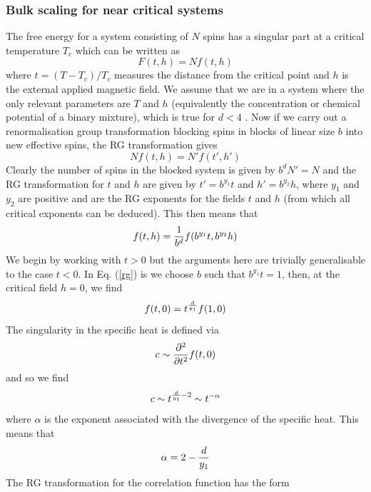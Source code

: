 \subsubsection{Bulk scaling for near critical systems}
The free energy for a system consisting of $N$ spins has a singular part at a critical temperature $T_c$ which can be written as
\begin{equation}
F(t,h) = N f(t,h)
\end{equation}
where $t = (T-T_c)/ T_c$ measures the distance from the critical point and $h$ is the external applied magnetic field. We assume that we are in a system where the only relevant parameters are $T$ and $h$ (equivalently the concentration or chemical potential of a binary mixture), which is true for $d\less 4$ \cite{amit_field_2005}.
Now if we carry out a renormalisation group transformation
blocking spins in blocks of linear size $b$ into new effective spins, the RG transformation
gives
\begin{equation}
N f(t,h) = N'f(t',h')
\end{equation}
Clearly the number of spins in the blocked system is given by $b^d N'=N$ and the RG transformation for $t$ and $h$ are given by $t' = b^{y_1} t$ and $h' = b^{y_2}h$, where $y_1$ and $y_2$ are positive and are the RG exponents for the fields $t$ and $h$ (from which all critical exponents can be deduced). This then means that
\begin{equation}
f(t,h) = {1\over b^d}f(b^{y_1} t, b^{y_2} h) 
\label{rg}
\end{equation}
We begin by working with $t\greater 0$ but the arguments here are trivially generalisable to the case $t\less 0$. In Eq. (\ref{rg}) is we choose $b$ such that $b^{y_1}t=1$, then, at the critical field $h=0$, we find
\begin{equation}
f(t,0) = t^{d\over y_1} f(1,0)
\end{equation}
The singularity in the specific heat is defined via
\begin{equation}
c\sim {\partial^2 \over \partial t^2}f(t,0)
\end{equation}
and so we find
\begin{equation}
c\sim t^{{d\over y_1}-2} \sim t^{-\alpha}
\end{equation}
where $\alpha$ is the exponent associated with the divergence of the specific heat. This means that
\begin{equation}
\alpha = 2 -{d\over y_1}
\end{equation}
The RG transformation for the correlation function has the form
